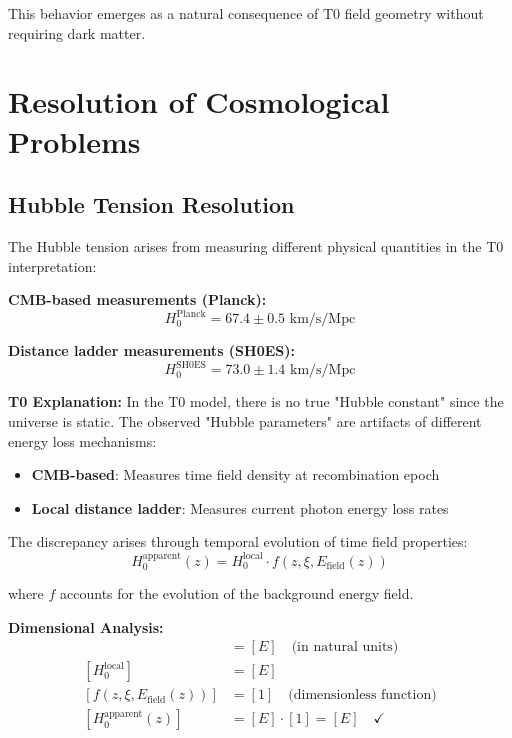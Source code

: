 \documentclass[12pt,a4paper]{report}
\begin{document}
This behavior emerges as a natural consequence of T0 field geometry without requiring dark matter.
	\section{Resolution of Cosmological Problems}
	\label{sec:cosmological_problems}
	
	\subsection{Hubble Tension Resolution}
	\label{subsec:hubble_tension_resolution}
	
	The Hubble tension arises from measuring different physical quantities in the T0 interpretation:
	
	\textbf{CMB-based measurements (Planck):}
	\begin{equation}
		H_0^{\text{Planck}} = 67.4 \pm 0.5 \text{ km/s/Mpc}
	\end{equation}
	
	\textbf{Distance ladder measurements (SH0ES):}
	\begin{equation}
		H_0^{\text{SH0ES}} = 73.0 \pm 1.4 \text{ km/s/Mpc}
	\end{equation}
	
	\textbf{T0 Explanation:}
	In the T0 model, there is no true "Hubble constant" since the universe is static. The observed "Hubble parameters" are artifacts of different energy loss mechanisms:
	
	\begin{itemize}
		\item \textbf{CMB-based}: Measures time field density at recombination epoch
		\item \textbf{Local distance ladder}: Measures current photon energy loss rates
	\end{itemize}
	
	The discrepancy arises through temporal evolution of time field properties:
	\begin{equation}
		H_0^{\text{apparent}}(z) = H_0^{\text{local}} \cdot f(z, \xi, E_{\text{field}}(z))
	\end{equation}
	
	where $f$ accounts for the evolution of the background energy field.
	
	\textbf{Dimensional Analysis:}
	\begin{align}
		[H_0^{\text{apparent}}(z)] &= [E] \quad \text{(in natural units)} \\
		[H_0^{\text{local}}] &= [E] \\
		[f(z, \xi, E_{\text{field}}(z))] &= [1] \quad \text{(dimensionless function)} \\
		[H_0^{\text{apparent}}(z)] &= [E] \cdot [1] = [E] \quad \checkmark
	\end{align}
	
\end{document}
